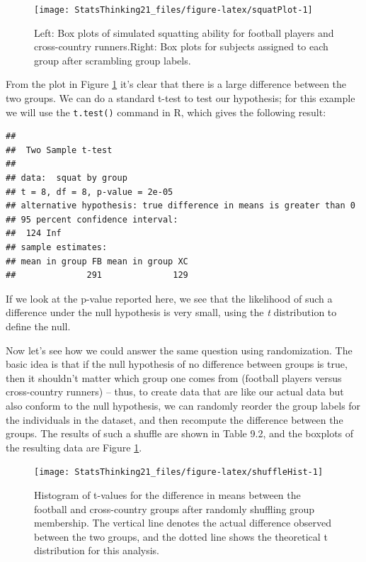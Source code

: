 \documentclass[12pt,]{book}
\theoremstyle{definition}
\theoremstyle{definition}
\theoremstyle{definition}
\theoremstyle{remark}
\begin{document}
\begin{figure}
\texttt{[image: StatsThinking21\_files/figure-latex/squatPlot-1]} \caption{Left: Box plots of simulated squatting ability for football players and cross-country runners.Right: Box plots for subjects assigned to each group after scrambling group labels.}\label{fig:squatPlot}
\end{figure}

From the plot in Figure \ref{fig:squatPlot} it's clear that there is a large difference between the two groups. We can do a standard t-test to test our hypothesis; for this example we will use the \texttt{t.test()} command in R, which gives the following result:

\begin{verbatim}
## 
##  Two Sample t-test
## 
## data:  squat by group
## t = 8, df = 8, p-value = 2e-05
## alternative hypothesis: true difference in means is greater than 0
## 95 percent confidence interval:
##  124 Inf
## sample estimates:
## mean in group FB mean in group XC 
##              291              129
\end{verbatim}

If we look at the p-value reported here, we see that the likelihood of such a difference under the null hypothesis is very small, using the \emph{t} distribution to define the null.

Now let's see how we could answer the same question using randomization. The basic idea is that if the null hypothesis of no difference between groups is true, then it shouldn't matter which group one comes from (football players versus cross-country runners) -- thus, to create data that are like our actual data but also conform to the null hypothesis, we can randomly reorder the group labels for the individuals in the dataset, and then recompute the difference between the groups. The results of such a shuffle are shown in Table 9.2, and the boxplots of the resulting data are Figure \ref{fig:squatPlot}.

\begin{figure}
\texttt{[image: StatsThinking21\_files/figure-latex/shuffleHist-1]} \caption{Histogram of t-values for the difference in means between the football and cross-country groups after randomly shuffling group membership.  The vertical line denotes the actual difference observed between the two groups, and the dotted line shows the theoretical t distribution for this analysis.}\label{fig:shuffleHist}
\end{figure}
\end{document}
